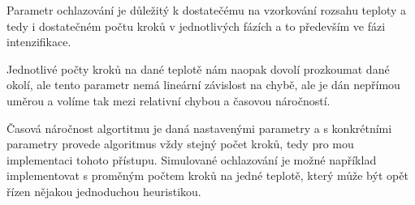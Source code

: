 \documentclass[11pt]{article}
\begin{document}
Parametr ochlazování je důležitý k dostatečému na vzorkování rozsahu teploty a tedy i dostatečném počtu kroků v jednotlivých fázích a to především ve fázi intenzifikace. 

Jednotlivé počty kroků na dané teplotě nám naopak dovolí prozkoumat dané okolí, ale tento parametr nemá lineární závislost na chybě, ale je dán nepřímou uměrou a volíme tak mezi relativní chybou a časovou náročností. 

Časová náročnost algortitmu je daná nastavenými parametry a s konkrétními parametry provede algoritmus vždy stejný počet kroků, tedy pro mou implementaci tohoto přístupu. Simulované ochlazování je možné například implementovat s proměným počtem kroků na jedné teplotě, který může být opět řízen nějakou jednoduchou heuristikou.
\end{document}
